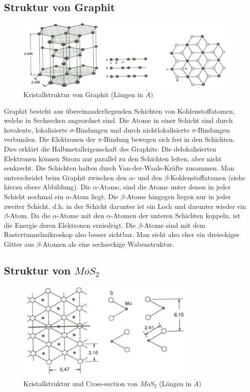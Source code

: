 \subsection{Struktur von Graphit}

\begin{figure}[H]
	\centering \includegraphics[width=\textwidth]{Bilder/Graphit.png}
	\caption{Kristallstruktur von Graphit (Längen in $\mathring{A})$}
\end{figure}

Graphit besteht aus übereinanderliegenden Schichten von Kohlenstoffatomen, welche in Sechs\-ecken angeordnet sind. Die Atome in einer Schicht sind durch kovalente, lokalisierte $\sigma$-Bindungen und durch nichtlokalisierte $\pi$-Bindungen verbunden. Die Elektronen der $\pi$-Bindung bewegen sich frei in den Schichten. Dies erklärt die Halbmetalleigenschaft des Graphits: Die delokalisierten Elektronen können Strom nur parallel zu den Schichten leiten, aber nicht senkrecht. Die Schichten halten durch Van-der-Waals-Kräfte zusammen. Man unterscheidet beim Graphit zwischen den $\alpha$- und den $\beta$-Kohlenstoffatomen (siehe hierzu obere Abbildung). Die $\alpha$-Atome, sind die Atome unter denen in jeder Schicht nochmal ein $\alpha$-Atom liegt. Die $\beta$-Atome hingegen liegen nur in jeder zweiter Schicht, d.h. in der Schicht darunter ist ein Loch und darunter wieder ein $\beta$-Atom. Da die $\alpha$-Atome mit den $\alpha$-Atomen der unteren Schichten koppeln, ist die Energie deren Elektronen erniedrigt. Die $\beta$-Atome sind mit dem Rastertunnelmikroskop also besser sichtbar. Man sieht also eher ein dreieckiges Gitter aus $\beta$-Atomen als eine sechseckige Wabenstruktur.

\subsection{Struktur von $MoS_2$}

\begin{figure}[H]
	\centering \includegraphics[width=0.8\textwidth]{Bilder/MoS2.png}
	\caption{Kristallstruktur und Cross-section von $MoS_2$ (Längen in $\mathring{A})$}
\end{figure}

